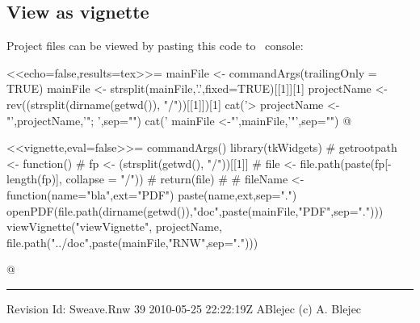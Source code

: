 \documentclass[a4paper,12pt]{article}
\newcommand{\SVNRevision}{$ $Rev: 39 $ $}
\newcommand{\SVNId}{$ $Id: Sweave.Rnw 39 2010-05-25 22:22:19Z ABlejec $ $}
\begin{document}
\subsection*{View as vignette}
Project files can be viewed by pasting this code to \R\ console:\\
\begin{Schunk}
\begin{Sinput}
<<echo=false,results=tex>>=
mainFile <- commandArgs(trailingOnly = TRUE)
mainFile <- strsplit(mainFile,'.',fixed=TRUE)[[1]][1]
projectName <- rev((strsplit(dirname(getwd()), "/"))[[1]])[1]
cat('> projectName <-"',projectName,'"; ',sep="")
cat(' mainFile <-"',mainFile,'"',sep="")
@

\end{Sinput}
\end{Schunk}
<<vignette,eval=false>>=
commandArgs()
library(tkWidgets)
# getrootpath <- function() {
# fp <- (strsplit(getwd(), "/"))[[1]]
# file <- file.path(paste(fp[-length(fp)], collapse = "/"))
# return(file)
# }
# fileName <- function(name="bla",ext="PDF") paste(name,ext,sep=".")
 openPDF(file.path(dirname(getwd()),"doc",paste(mainFile,"PDF",sep=".")))
 viewVignette("viewVignette", projectName, file.path("../doc",paste(mainFile,"RNW",sep=".")))

@

\vfill \hrule \vspace{2pt} \footnotesize{
Revision \SVNId\hfill (c) A. Blejec%
}
\end{document}
